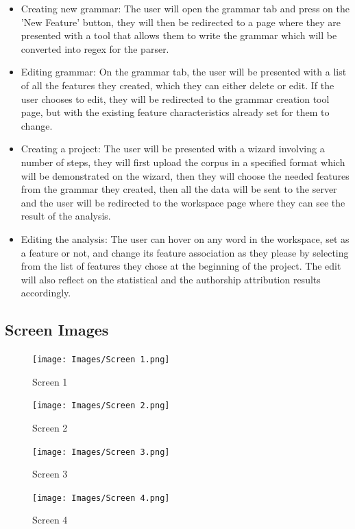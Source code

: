 \documentclass[12pt]{article}
\begin{document}
\begin{itemize}
  \item Creating new grammar: The user will open the grammar tab and press on the 'New Feature' button, they will then be redirected to a page where they are presented with a tool that allows them to write the grammar which will be converted into regex for the parser.
  \item Editing grammar: On the grammar tab, the user will be presented with a list of all the features they created, which they can either delete or edit. If the user chooses to edit, they will be redirected to the grammar creation tool page, but with the existing feature characteristics already set for them to change.
  \item Creating a project: The user will be presented with a wizard involving a number of steps, they will first upload the corpus in a specified format which will be demonstrated on the wizard, then they will choose the needed features from the grammar they created, then all the data will be sent to the server and the user will be redirected to the workspace page where they can see the result of the analysis.
  \item Editing the analysis: The user can hover on any word in the workspace, set as a feature or not, and change its feature association as they please by selecting from the list of features they chose at the beginning of the project. The edit will also reflect on the statistical and the authorship attribution results accordingly.
\end{itemize}

\subsection {Screen Images}
\begin{figure}[H]
  \texttt{[image: Images/Screen 1.png]}
  \caption{Screen 1}
\end{figure}

\begin{figure}[H]
  \texttt{[image: Images/Screen 2.png]}
  \caption{Screen 2}
\end{figure}

\begin{figure}[H]
  \texttt{[image: Images/Screen 3.png]}
  \caption{Screen 3}
\end{figure}
\begin{figure}[H]
  \texttt{[image: Images/Screen 4.png]}
  \caption{Screen 4}
\end{figure}
\end{document}
